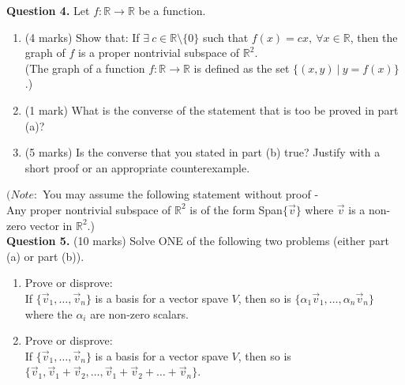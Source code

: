 \documentclass{article}
\newcommand{\R}{\mathbb{R}}
\begin{document}
\textbf{Question 4.} Let $f: \R \to \R$ be a function.

\begin{enumerate}[label=(\alph*), leftmargin=6.25mm]
    \item (4 marks)
    Show that: If $\exists\ c \in \R \setminus \{ 0 \}$ such that $f(x) = cx,\ \forall x \in \R$, then the graph of $f$ is a proper nontrivial subspace of $\R^2$. \\
    (The graph of a function $f: \R \to \R$ is defined as the set $\{ (x, y) \ |\ y = f(x)\}$.)

    \item (1 mark)
    What is the converse of the statement that is too be proved in part (a)?

    \item (5 marks)
    Is the converse that you stated in part (b) true? Justify with a short proof or an appropriate counterexample.
\end{enumerate}

$(Note:$ You may assume the following statement without proof - \\

Any proper nontrivial subspace of $\R^2$ is of the form Span$\{ \vec{v} \}$ where $\vec{v}$ is a non-zero vector in $\R^2$.) \\[8mm]


\textbf{Question 5.} (10 marks)
Solve ONE of the following two problems (either part (a) or part (b)).

\begin{enumerate}[label=(\alph*), leftmargin=6.25mm]
    \item Prove or disprove: \\
    If $\{ \vec{v}_1, \ldots, \vec{v}_n \}$ is a basis for a vector spave $V$, then so is $\{ \alpha_1 \vec{v}_1, \ldots,  \alpha_n \vec{v}_n \}$ where the $\alpha_i$ are non-zero scalars.

    \item Prove or disprove: \\
    If $\{ \vec{v}_1, \ldots, \vec{v}_n \}$ is a basis for a vector spave $V$, then so is $\{ \vec{v}_1, \vec{v}_1 + \vec{v}_2, \ldots,  \vec{v}_1 + \vec{v}_2 + \ldots + \vec{v}_n \}$.
\end{enumerate}
\end{document}
